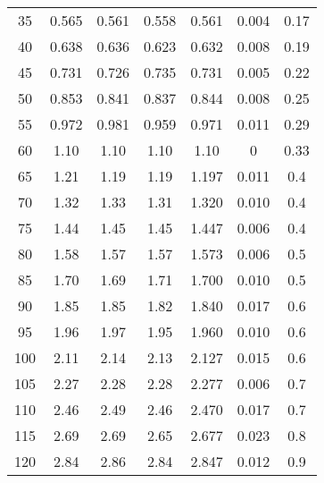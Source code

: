 \begin{table}[H]
{\begin{tabular}{
      S[table-format=3.0] 
      S[table-format=1.4] S[table-format=1.4] S[table-format=1.4]
      S[table-format=1.4] S[table-format=1.4] S[table-format=1.3]
      }
      35  & 0.565  &  0.561  &  0.558  &  0.561  & 0.004  & 0.17   \\
      40  & 0.638  &  0.636  &  0.623  &  0.632  & 0.008  & 0.19   \\
      45  & 0.731  &  0.726  &  0.735  &  0.731  & 0.005  & 0.22   \\
      50  & 0.853  &  0.841  &  0.837  &  0.844  & 0.008  & 0.25   \\
      55  & 0.972  &  0.981  &  0.959  &  0.971  & 0.011  & 0.29   \\
      60  & 1.10   &  1.10   &  1.10   &  1.10   & 0      & 0.33   \\
      65  & 1.21   &  1.19   &  1.19   &  1.197  & 0.011  & 0.4    \\
      70  & 1.32   &  1.33   &  1.31   &  1.320  & 0.010  & 0.4    \\
      75  & 1.44   &  1.45   &  1.45   &  1.447  & 0.006  & 0.4    \\
      80  & 1.58   &  1.57   &  1.57   &  1.573  & 0.006  & 0.5    \\
      85  & 1.70   &  1.69   &  1.71   &  1.700  & 0.010  & 0.5    \\
      90  & 1.85   &  1.85   &  1.82   &  1.840  & 0.017  & 0.6    \\
      95  & 1.96   &  1.97   &  1.95   &  1.960  & 0.010  & 0.6    \\
      100 & 2.11   &  2.14   &  2.13   &  2.127  & 0.015  & 0.6    \\
      105 & 2.27   &  2.28   &  2.28   &  2.277  & 0.006  & 0.7    \\
      110 & 2.46   &  2.49   &  2.46   &  2.470  & 0.017  & 0.7    \\
      115 & 2.69   &  2.69   &  2.65   &  2.677  & 0.023  & 0.8    \\
      120 & 2.84   &  2.86   &  2.84   &  2.847  & 0.012  & 0.9    \\
      \bottomrule 
    \end{tabular}
    }
\end{table}
%
